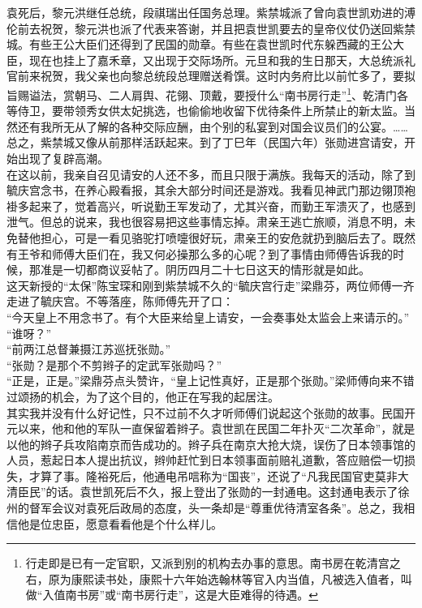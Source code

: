 袁死后，黎元洪继任总统，段祺瑞出任国务总理。紫禁城派了曾向袁世凯劝进的溥伦前去祝贺，黎元洪也派了代表来答谢，并且把袁世凯要去的皇帝仪仗仍送回紫禁城。有些王公大臣们还得到了民国的勋章。有些在袁世凯时代东躲西藏的王公大臣，现在也挂上了嘉禾章，又出现于交际场所。元旦和我的生日那天，大总统派礼官前来祝贺，我父亲也向黎总统段总理赠送肴馔。这时内务府比以前忙多了，要拟旨赐谥法，赏朝马、二人肩舆、花翎、顶戴，要授什么“南书房行走”\footnote{行走即是已有一定官职，又派到别的机构去办事的意思。南书房在乾清宫之右，原为康熙读书处，康熙十六年始选翰林等官入内当值，凡被选入值者，叫做“入值南书房”或“南书房行走”，这是大臣难得的待遇。}、乾清门各等侍卫，要带领秀女供太妃挑选，也偷偷地收留下优待条件上所禁止的新太监。当然还有我所无从了解的各种交际应酬，由个别的私宴到对国会议员们的公宴。……\\

总之，紫禁城又像从前那样活跃起来。到了丁巳年（民国六年）张勋进宫请安，开始出现了复辟高潮。\\

在这以前，我亲自召见请安的人还不多，而且只限于满族。我每天的活动，除了到毓庆宫念书，在养心殿看报，其余大部分时间还是游戏。我看见神武门那边翎顶袍褂多起来了，觉着高兴，听说勤王军发动了，尤其兴奋，而勤王军溃灭了，也感到泄气。但总的说来，我也很容易把这些事情忘掉。肃亲王逃亡旅顺，消息不明，未免替他担心，可是一看见骆驼打喷嚏很好玩，肃亲王的安危就扔到脑后去了。既然有王爷和师傅大臣们在，我又何必操那么多的心呢？到了事情由师傅告诉我的时候，那准是一切都商议妥帖了。阴历四月二十七日这天的情形就是如此。\\

这天新授的“太保”陈宝琛和刚到紫禁城不久的“毓庆宫行走”梁鼎芬，两位师傅一齐走进了毓庆宫。不等落座，陈师傅先开了口：\\

“今天皇上不用念书了。有个大臣来给皇上请安，一会奏事处太监会上来请示的。”\\

“谁呀？”\\

“前两江总督兼摄江苏巡抚张勋。”\\

“张勋？是那个不剪辫子的定武军张勋吗？”\\

“正是，正是。”梁鼎芬点头赞许，“皇上记性真好，正是那个张勋。”梁师傅向来不错过颂扬的机会，为了这个目的，他正在写我的起居注。\\

其实我并没有什么好记性，只不过前不久才听师傅们说起这个张勋的故事。民国开元以来，他和他的军队一直保留着辫子。袁世凯在民国二年扑灭“二次革命”，就是以他的辫子兵攻陷南京而告成功的。辫子兵在南京大抢大烧，误伤了日本领事馆的人员，惹起日本人提出抗议，辫帅赶忙到日本领事面前赔礼道歉，答应赔偿一切损失，才算了事。隆裕死后，他通电吊唁称为“国丧”，还说了“凡我民国官吏莫非大清臣民”的话。袁世凯死后不久，报上登出了张勋的一封通电。这封通电表示了徐州的督军会议对袁死后政局的态度，头一条却是“尊重优待清室各条”。总之，我相信他是位忠臣，愿意看看他是个什么样儿。\\

